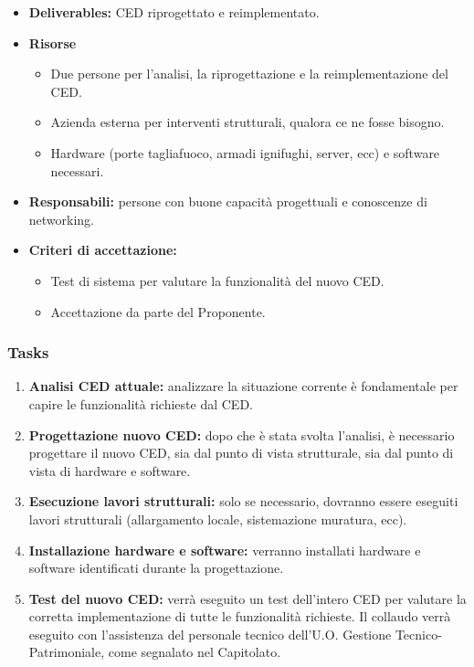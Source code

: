                 \begin{itemize}
               		\item  \textbf{Deliverables:} CED riprogettato e reimplementato.
                    \item  \textbf{Risorse} 
                    \begin{itemize}
                    	\item Due persone per l'analisi, la riprogettazione e la reimplementazione del CED.
                        \item Azienda esterna per interventi strutturali, qualora ce ne fosse bisogno.
                        \item Hardware (porte tagliafuoco, armadi ignifughi, server, ecc) e software necessari.
                	\end{itemize}
                    \item  \textbf{Responsabili:} persone con buone capacità progettuali e conoscenze di networking. 
                    \item  \textbf{Criteri di accettazione:} 
                    \begin{itemize}
                    	\item Test di sistema per valutare la funzionalità del nuovo CED.
                        \item Accettazione da parte del Proponente.
                    \end{itemize}
                \end{itemize}
                
                \subsubsection*{Tasks}
                	\begin{enumerate}
                		\item \textbf{Analisi CED attuale:} analizzare la situazione corrente è fondamentale per capire le funzionalità richieste dal CED.
                        \item \textbf{Progettazione nuovo CED:} dopo che è stata svolta l'analisi, è necessario progettare il nuovo CED, sia dal punto di vista strutturale, sia dal punto di vista di hardware e software.
                        \item \textbf{Esecuzione lavori strutturali:} solo se necessario, dovranno essere eseguiti lavori strutturali (allargamento locale, sistemazione muratura, ecc).
                        \item \textbf{Installazione hardware e software:} verranno installati hardware e software identificati durante la progettazione.
                        \item \textbf{Test del nuovo CED:} verrà eseguito un test dell'intero CED per valutare la corretta implementazione di tutte le funzionalità richieste. Il collaudo verrà eseguito con l'assistenza del personale tecnico dell'U.O. Gestione Tecnico-Patrimoniale, come segnalato nel Capitolato. 
                	\end{enumerate}
                    
